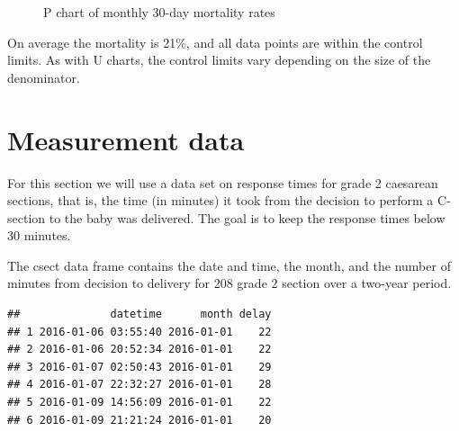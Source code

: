 \documentclass[
]{book}
\makeatletter
\newenvironment{Shaded}{\begin{snugshade}}{\end{snugshade}}
\newcommand{\AttributeTok}[1]{\textcolor[rgb]{0.13,0.29,0.53}{#1}}
\newcommand{\CommentTok}[1]{\textcolor[rgb]{0.56,0.35,0.01}{\textit{#1}}}
\newcommand{\FunctionTok}[1]{\textcolor[rgb]{0.13,0.29,0.53}{\textbf{#1}}}
\newcommand{\NormalTok}[1]{#1}
\newcommand{\OtherTok}[1]{\textcolor[rgb]{0.56,0.35,0.01}{#1}}
\newcommand{\SpecialCharTok}[1]{\textcolor[rgb]{0.81,0.36,0.00}{\textbf{#1}}}
\newcommand{\StringTok}[1]{\textcolor[rgb]{0.31,0.60,0.02}{#1}}
\newcommand*\pandocbounded[1]{%
  \sbox\pandoc@box{#1}%
  \Gscale@div\@tempa{\textheight}{\dimexpr\ht\pandoc@box+\dp\pandoc@box\relax}%
  \Gscale@div\@tempb{\linewidth}{\wd\pandoc@box}%
  \ifdim\@tempb\p@<\@tempa\p@\let\@tempa\@tempb\fi%
  \ifdim\@tempa\p@<\p@\scalebox{\@tempa}{\usebox\pandoc@box}%
  \else\usebox{\pandoc@box}%
  \fi%
}
\makeatother
\begin{document}
\begin{figure}
\centering
\pandocbounded{}
\caption{\label{fig:limits-p}P chart of monthly 30-day mortality rates}
\end{figure}

On average the mortality is 21\%, and all data points are within the control limits. As with U charts, the control limits vary depending on the size of the denominator.

\section{Measurement data}\label{measurement-data}

For this section we will use a data set on response times for grade 2 caesarean sections, that is, the time (in minutes) it took from the decision to perform a C-section to the baby was delivered. The goal is to keep the response times below 30 minutes.

The csect data frame contains the date and time, the month, and the number of minutes from decision to delivery for 208 grade 2 section over a two-year period.

\begin{Shaded}
\end{Shaded}

\begin{verbatim}
##              datetime      month delay
## 1 2016-01-06 03:55:40 2016-01-01    22
## 2 2016-01-06 20:52:34 2016-01-01    22
## 3 2016-01-07 02:50:43 2016-01-01    29
## 4 2016-01-07 22:32:27 2016-01-01    28
## 5 2016-01-09 14:56:09 2016-01-01    22
## 6 2016-01-09 21:21:24 2016-01-01    20
\end{verbatim}
\end{document}
